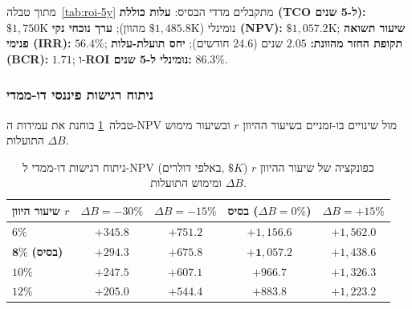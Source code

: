 מתוך טבלה~\ref{tab:roi-5y} מתקבלים מדדי הבסיס: \textbf{עלות כוללת (\textenglish{TCO} ל-5 שנים):} $\$1{,}750\text{K}$ נומינלי ($\$1{,}485.8\text{K}$ מהוון); \textbf{ערך נוכחי נקי (\textenglish{NPV}):} $\$1{,}057.2\text{K}$; \textbf{שיעור תשואה פנימי (\textenglish{IRR}):} $56.4\%$; \textbf{תקופת החזר מהוונת:} $2.05$ שנים ($24.6$ חודשים); \textbf{יחס תועלת-עלות (\textenglish{BCR}):} $1.71$; ו-\textbf{\textenglish{ROI} נומינלי ל-5 שנים:} $86.3\%$.

\subsubsection{ניתוח רגישות פיננסי דו-ממדי}
טבלה~\ref{tab:roi-sensitivity} בוחנת את עמידות ה-\textenglish{NPV} מול שינויים בו-זמניים בשיעור ההיוון $r$ ובשיעור מימוש התועלות $\Delta B$.

\begin{table}[htbp]
\centering
\caption{ניתוח רגישות דו-ממדי ל-\textenglish{NPV} (באלפי דולרים, $\$K$) כפונקציה של שיעור ההיוון $r$ ומימוש התועלות $\Delta B$.}
\label{tab:roi-sensitivity}
\begin{tabular}{@{}lcccc@{}}
\toprule
\textbf{שיעור היוון $r$} & $\Delta B = -30\%$ & $\Delta B = -15\%$ & \textbf{בסיס ($\Delta B = 0\%$)} & $\Delta B = +15\%$ \\
\midrule
$6\%$ & $+345.8$ & $+751.2$ & $+1{,}156.6$ & $+1{,}562.0$ \\
$\mathbf{8\%}$ \textbf{(בסיס)} & $+294.3$ & $+675.8$ & $\mathbf{+1{,}057.2}$ & $+1{,}438.6$ \\
$10\%$ & $+247.5$ & $+607.1$ & $+966.7$ & $+1{,}326.3$ \\
$12\%$ & $+205.0$ & $+544.4$ & $+883.8$ & $+1{,}223.2$ \\
\bottomrule
\end{tabular}
\end{table}

